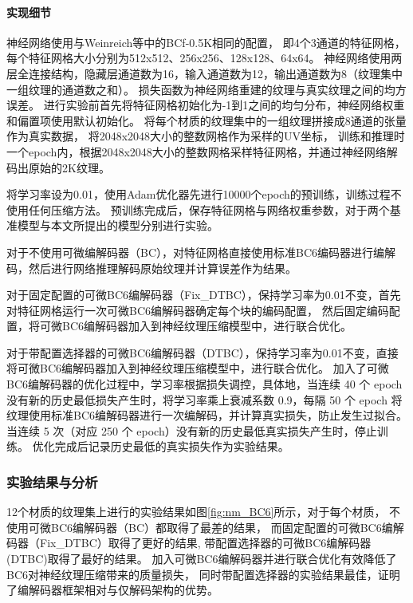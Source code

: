 \paragraph{实现细节}

神经网络使用与Weinreich等\cite{weinreich2024real}中的BCf-0.5K相同的配置，
即4个3通道的特征网格，每个特征网格大小分别为512x512、256x256、128x128、64x64。
神经网络使用两层全连接结构，隐藏层通道数为16，输入通道数为12，输出通道数为8（纹理集中一组纹理的通道数之和）。
损失函数为神经网络重建的纹理与真实纹理之间的均方误差。
进行实验前首先将特征网格初始化为-1到1之间的均匀分布，神经网络权重和偏置项使用默认初始化。
将每个材质的纹理集中的一组纹理拼接成8通道的张量作为真实数据，
将2048x2048大小的整数网格作为采样的UV坐标，
训练和推理时一个epoch内，根据2048x2048大小的整数网格采样特征网格，并通过神经网络解码出原始的2K纹理。

将学习率设为0.01，使用Adam优化器先进行10000个epoch的预训练，训练过程不使用任何压缩方法。
预训练完成后，保存特征网格与网络权重参数，对于两个基准模型与本文所提出的模型分别进行实验。

对于不使用可微编解码器（BC），对特征网格直接使用标准BC6编码器进行编解码，然后进行网络推理解码原始纹理并计算误差作为结果。

对于固定配置的可微BC6编解码器（Fix\_DTBC），保持学习率为0.01不变，首先对特征网格运行一次可微BC6编解码器确定每个块的编码配置，
然后固定编码配置，将可微BC6编解码器加入到神经纹理压缩模型中，进行联合优化。

对于带配置选择器的可微BC6编解码器（DTBC），保持学习率为0.01不变，直接将可微BC6编解码器加入到神经纹理压缩模型中，进行联合优化。
加入了可微BC6编解码器的优化过程中，学习率根据损失调控，具体地，当连续 40 个 epoch 没有新的历史最低损失产生时，将学习率乘上衰减系数 0.9，每隔 50 个 epoch 将纹理使用标准BC6编解码器进行一次编解码，并计算真实损失，防止发生过拟合。当连续 5 次（对应 250 个 epoch）没有新的历史最低真实损失产生时，停止训练。
优化完成后记录历史最低的真实损失作为实验结果。

\subsubsection{实验结果与分析}

12个材质的纹理集上进行的实验结果如图\ref{fig:nm_BC6}所示，对于每个材质，
不使用可微BC6编解码器（BC）都取得了最差的结果，
而固定配置的可微BC6编解码器（Fix\_DTBC）取得了更好的结果,
带配置选择器的可微BC6编解码器(DTBC)取得了最好的结果。
加入可微BC6编解码器并进行联合优化有效降低了BC6对神经纹理压缩带来的质量损失，
同时带配置选择器的实验结果最佳，证明了编解码器框架相对与仅解码架构的优势。


